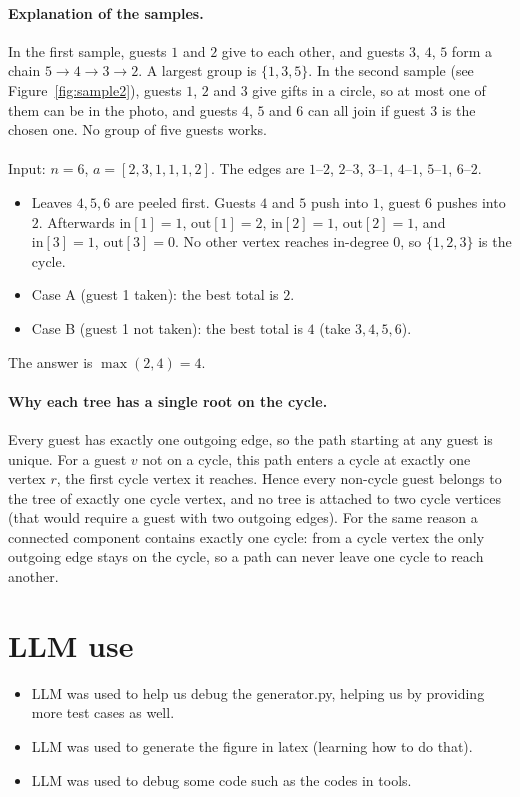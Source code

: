 \documentclass[11pt]{article}
\begin{document}
\paragraph{Explanation of the samples.}
In the first sample, guests $1$ and $2$ give to each other, and guests $3$, $4$, $5$ form a chain $5 \to 4 \to 3 \to 2$. A largest group is $\{1, 3, 5\}$. In the second sample (see Figure~\ref{fig:sample2}), guests $1$, $2$ and $3$ give gifts in a circle, so at most one of them can be in the photo, and guests $4$, $5$ and $6$ can all join if guest $3$ is the chosen one. No group of five guests works.\\\\
Input: $n = 6$, $a = [2, 3, 1, 1, 1, 2]$. The edges are $1\text{--}2$, $2\text{--}3$, $3\text{--}1$, $4\text{--}1$, $5\text{--}1$, $6\text{--}2$.
\begin{itemize}
    \item Leaves $4, 5, 6$ are peeled first. Guests $4$ and $5$ push into $1$, guest $6$ pushes into $2$. Afterwards $\mathrm{in}[1] = 1$, $\mathrm{out}[1] = 2$, $\mathrm{in}[2] = 1$, $\mathrm{out}[2] = 1$, and $\mathrm{in}[3] = 1$, $\mathrm{out}[3] = 0$. No other vertex reaches in-degree $0$, so $\{1, 2, 3\}$ is the cycle.
    \item Case A (guest 1 taken): the best total is $2$.
    \item Case B (guest 1 not taken): the best total is $4$ (take $3, 4, 5, 6$).
\end{itemize}
The answer is $\max(2, 4) = 4$.




\paragraph{Why each tree has a single root on the cycle.}
Every guest has exactly one outgoing edge, so the path starting at any guest is unique. For a guest $v$ not on a cycle, this path enters a cycle at exactly one vertex $r$, the first cycle vertex it reaches. Hence every non-cycle guest belongs to the tree of exactly one cycle vertex, and no tree is attached to two cycle vertices (that would require a guest with two outgoing edges). For the same reason a connected component contains exactly one cycle: from a cycle vertex the only outgoing edge stays on the cycle, so a path can never leave one cycle to reach another.



\section*{LLM use}
\begin{itemize}
    \item LLM was used to help us debug the generator.py, helping us by providing more test cases as well.
    \item LLM was used to generate the figure in latex (learning how to do that).
    \item LLM was used to debug some code such as the codes in tools.
\end{itemize}
\end{document}
